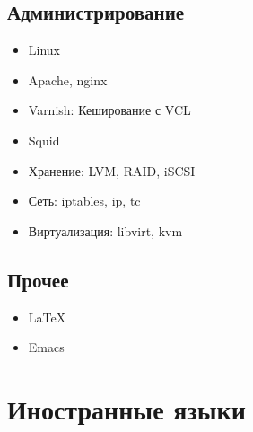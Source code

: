 \documentclass[11pt,a4paper,sans]{moderncv}        %
\begin{document}
\subsection{Администрирование}

\begin{itemize}
\item Linux
\item Apache, nginx
\item Varnish: Кеширование с VCL
\item Squid
\item Хранение: LVM, RAID, iSCSI
\item Сеть: iptables, ip, tc
\item Виртуализация: libvirt, kvm
\end{itemize}

\subsection{Прочее}

\begin{itemize}
\item \LaTeX
\item Emacs
\end{itemize}

\section{Иностранные языки}


\nocite{*}

\end{document}
